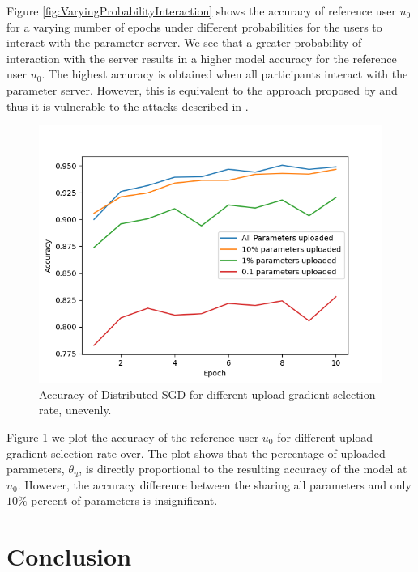 \documentclass[conference]{IEEEtran}
\begin{document}
Figure \ref{fig:VaryingProbabilityInteraction} shows the accuracy of reference user $u_0$ for a varying number of epochs under
different probabilities for the users to interact with the parameter server. 
We see that a greater probability of interaction with the server results in a higher model accuracy for the reference user $u_0$.
The highest accuracy is obtained when all participants interact with the parameter server. However, this is equivalent to the
approach proposed by \cite{shokri2015privacy} and thus it is vulnerable to the attacks described in \cite{hitaj2017deep}. 


\begin{figure}[!h]
\centering
\includegraphics[width=\columnwidth, keepaspectratio]{VaryingThetaU}
\caption{Accuracy of Distributed SGD for different upload gradient selection rate, unevenly. }
\label{fig:VaryingThetaU}
\end{figure}

Figure \ref{fig:VaryingThetaU} we plot the accuracy of the reference user $u_0$ for different upload gradient selection rate over. 
The plot shows that the percentage of uploaded parameters, $\theta_u$, is directly proportional to the resulting accuracy of
the model at $u_0$. However, the accuracy difference between the sharing all parameters and only $ 10\% $ percent of parameters is
insignificant.



\section{Conclusion}






\end{document}
